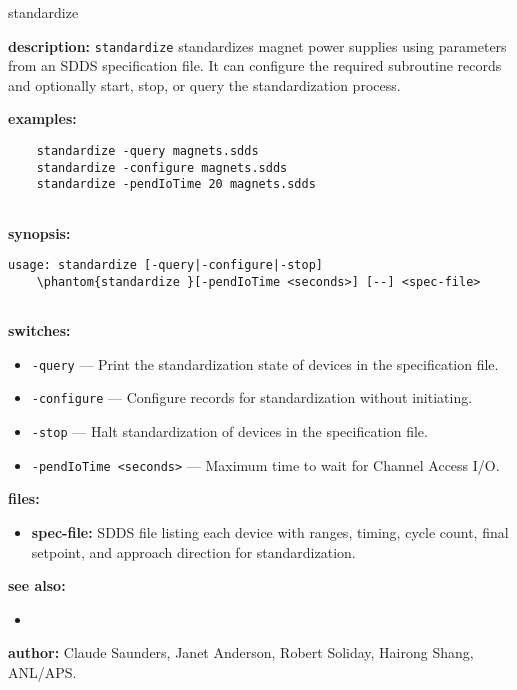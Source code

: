 \begin{sddsprog}{standardize}
\item \textbf{description:}
\verb+standardize+ standardizes magnet power supplies using parameters from an SDDS specification file.
It can configure the required subroutine records and optionally start, stop, or query the standardization process.

\item \textbf{examples:}
  \begin{verbatim}
    standardize -query magnets.sdds
    standardize -configure magnets.sdds
    standardize -pendIoTime 20 magnets.sdds
  
\end{verbatim}

\item \textbf{synopsis:}
  \begin{verbatim}
usage: standardize [-query|-configure|-stop]
    \phantom{standardize }[-pendIoTime <seconds>] [--] <spec-file>
  
\end{verbatim}

\item \textbf{switches:}
\begin{itemize}
  \item {\tt -query} --- Print the standardization state of devices in the specification file.
  \item {\tt -configure} --- Configure records for standardization without initiating.
  \item {\tt -stop} --- Halt standardization of devices in the specification file.
  \item {\tt -pendIoTime <seconds>} --- Maximum time to wait for Channel Access I/O.
\end{itemize}

\item \textbf{files:}
\begin{itemize}
  \item \textbf{spec-file:} SDDS file listing each device with ranges, timing, cycle count, final setpoint, and approach direction for standardization.
\end{itemize}

\item \textbf{see also:}
\begin{itemize}
  \item {}
\end{itemize}

\item \textbf{author:} Claude Saunders, Janet Anderson, Robert Soliday, Hairong Shang, ANL/APS.
\end{sddsprog}
